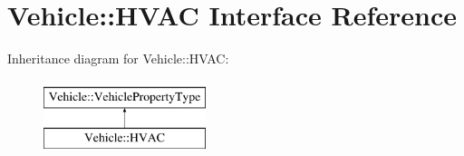 \hypertarget{interfaceVehicle_1_1HVAC}{\section{Vehicle\-:\-:H\-V\-A\-C Interface Reference}
\label{interfaceVehicle_1_1HVAC}
}
Inheritance diagram for Vehicle\-:\-:H\-V\-A\-C\-:\begin{figure}[H]
\begin{center}
\leavevmode
\includegraphics[height=2.000000cm]{interfaceVehicle_1_1HVAC}
\end{center}
\end{figure}
